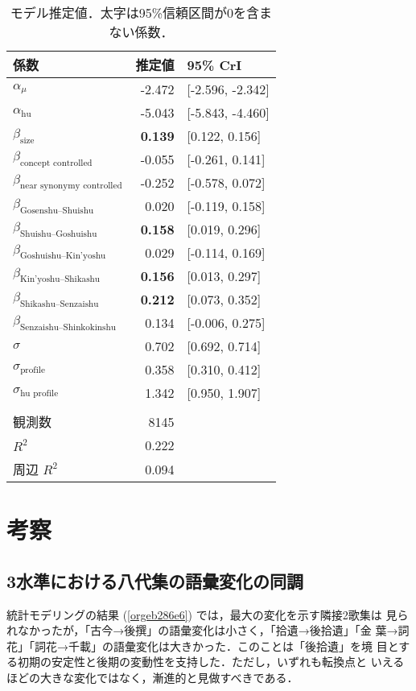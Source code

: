 \documentclass[submit]{ipsj}
\renewcommand{\ref}{\cref}
\begin{document}
\begin{table}[tb]
\caption{\label{tab:orge4cde2a}モデル推定値．太字は95\%信頼区間が0を含まない係数．}
\centering
\begin{tabular}{lrl}
係数 & 推定値 & 95\% CrI\\
\hline
\(\alpha_{\mu}\) & -2.472 & {[}-2.596, -2.342]\\
\(\alpha_{\text{hu}}\) & -5.043 & {[}-5.843, -4.460]\\
\(\beta_{\text{size}}\) & \textbf{0.139} & {[}0.122, 0.156]\\
\(\beta_{\text{concept controlled}}\) & -0.055 & {[}-0.261, 0.141]\\
\(\beta_{\text{near synonymy controlled}}\) & -0.252 & {[}-0.578, 0.072]\\
\(\beta_{\text{Gosenshu--Shuishu}}\) & 0.020 & {[}-0.119, 0.158]\\
\(\beta_{\text{Shuishu--Goshuishu}}\) & \textbf{0.158} & {[}0.019, 0.296]\\
\(\beta_{\text{Goshuishu--Kin'yoshu}}\) & 0.029 & {[}-0.114, 0.169]\\
\(\beta_{\text{Kin'yoshu--Shikashu}}\) & \textbf{0.156} & {[}0.013, 0.297]\\
\(\beta_{\text{Shikashu--Senzaishu}}\) & \textbf{0.212} & {[}0.073, 0.352]\\
\(\beta_{\text{Senzaishu--Shinkokinshu}}\) & 0.134 & {[}-0.006, 0.275]\\
\(\sigma\) & 0.702 & {[}0.692, 0.714]\\
\(\sigma_{\text{profile}}\) & 0.358 & {[}0.310, 0.412]\\
\(\sigma_{\text{hu profile}}\) & 1.342 & {[}0.950, 1.907]\\
 &  & \\
観測数 & 8145 & \\
\(R^2\) & 0.222 & \\
周辺 \(R^2\) & 0.094 & \\
\end{tabular}
\end{table}
\section{考察\label{org935cf01}}
\label{sec:org3c8621b}
\subsection{3水準における八代集の語彙変化の同調\label{org1415232}}
\label{sec:org1f65fb8}
統計モデリングの結果 (\ref{orgeb286e6}) では，最大の変化を示す隣接2歌集は
見られなかったが，「古今→後撰」の語彙変化は小さく，「拾遺→後拾遺」「金
葉→詞花」「詞花→千載」の語彙変化は大きかった．このことは「後拾遺」を境
目とする初期の安定性と後期の変動性を支持した．ただし，いずれも転換点と
いえるほどの大きな変化ではなく，漸進的と見做すべきである．
\end{document}
